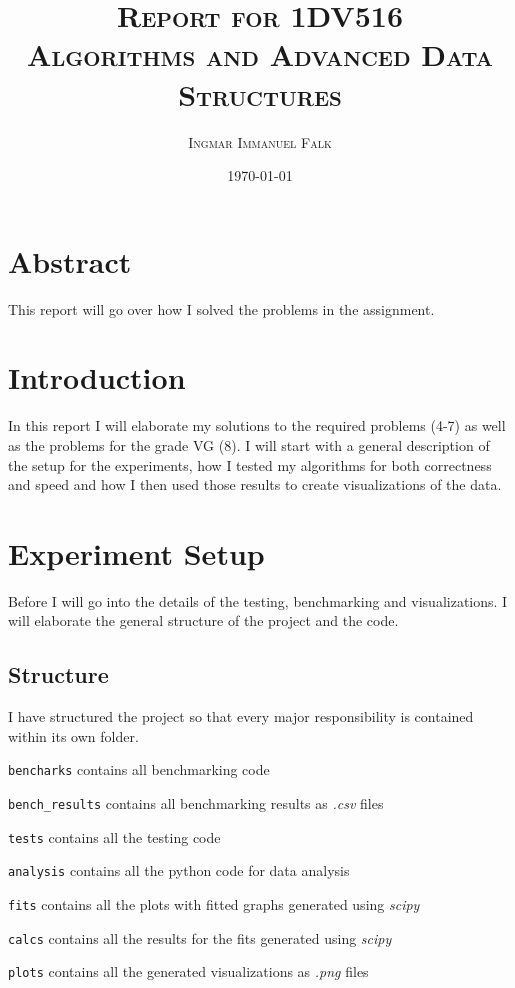 \documentclass[12pt]{article}
\title{\textsc{Report for 1DV516\\\large{Algorithms and Advanced Data Structures}}}
\author{\textsc{Ingmar Immanuel Falk}}
\date{\textsc{\today}}
\begin{document}
\maketitle
\pagebreak
\tableofcontents
\pagebreak

\section{Abstract}
This report will go over how I solved the problems in the assignment.

\section{Introduction}

In this report I will elaborate my solutions to the required problems (4-7) as well
as the problems for the grade VG (8).
I will start with a general description of the setup for the experiments, how I tested
my algorithms for both correctness and speed and how I then used those results to 
create visualizations of the data.

\section{Experiment Setup}

Before I will go into the details of the testing, benchmarking and visualizations. I will elaborate
the general structure of the project and the code. 

\subsection{Structure}

I have structured the project so that every major responsibility is contained within its 
own folder.

\texttt{bencharks} contains all benchmarking code

\texttt{bench\_results} contains all benchmarking results as \emph{.csv} files

\texttt{tests} contains all the testing code

\texttt{analysis} contains all the python code for data analysis

\texttt{fits} contains all the plots with fitted graphs generated using \emph{scipy}

\texttt{calcs} contains all the results for the fits generated using \emph{scipy} 

\texttt{plots} contains all the generated visualizations as \emph{.png} files
\end{document}
